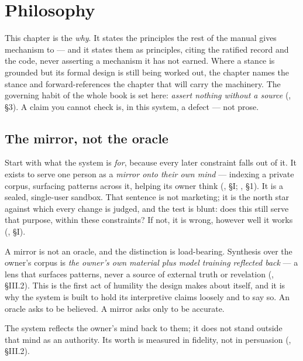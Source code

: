 \chapter{Philosophy}
\label{ch:philosophy}

This chapter is the \emph{why}. It states the principles the rest of the manual
gives mechanism to --- and it states them as principles, citing the ratified
record and the code, never asserting a mechanism it has not earned. Where a stance
is grounded but its formal design is still being worked out, the chapter names the
stance and forward-references the chapter that will carry the machinery. The
governing habit of the whole book is set here: \emph{assert nothing without a
source} (, \S 3). A claim you cannot check is, in this
system, a defect --- not prose.

\section{The mirror, not the oracle}
\label{sec:mirror}

Start with what the system is \emph{for}, because every later constraint falls out
of it. It exists to serve one person as a \emph{mirror onto their own mind} ---
indexing a private corpus, surfacing patterns across it, helping its owner think
(, \S I; ,
\S 1). It is a sealed, single-user sandbox. That sentence is not marketing; it is
the north star against which every change is judged, and the test is blunt: does
this still serve that purpose, within these constraints? If not, it is wrong,
however well it works (, \S I).

A mirror is not an oracle, and the distinction is load-bearing. Synthesis over the
owner's corpus is \emph{the owner's own material plus model training reflected
back} --- a lens that surfaces patterns, never a source of external truth or
revelation (, \S III.2). This is the first act of
humility the design makes about itself, and it is why the system is built to hold
its interpretive claims loosely and to say so. An oracle asks to be believed. A
mirror asks only to be accurate.

\begin{principle}
The system reflects the owner's mind back to them; it does not stand outside that
mind as an authority. Its worth is measured in fidelity, not in persuasion
(, \S III.2).
\end{principle}

